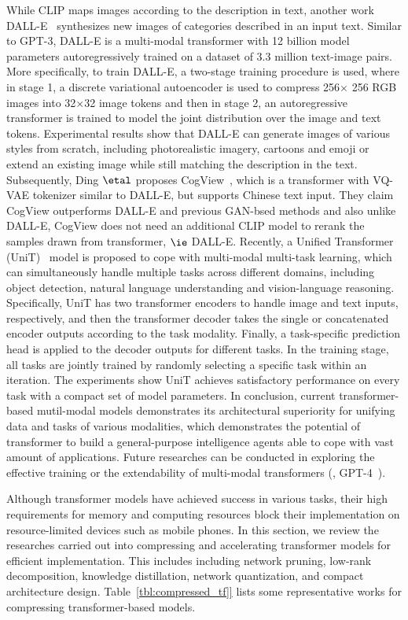While CLIP maps images according to the description in text, another work DALL-E~ synthesizes new images of categories described in an input text. Similar to GPT-3, DALL-E is a multi-modal transformer with 12 billion model parameters autoregressively trained on a dataset of 3.3 million text-image pairs. More specifically, to train DALL-E, a two-stage training procedure is used, where in stage 1, a discrete variational autoencoder is used to compress 256$\times$ 256 RGB images into 32$\times$32 image tokens and then in stage 2, an autoregressive transformer is trained to model the joint distribution over the image and text tokens. Experimental results show that DALL-E can generate images of various styles from scratch, including photorealistic imagery, cartoons and emoji or extend an existing image while still matching the description in the text. Subsequently, Ding $\etal$ proposes CogView~, which is a transformer with VQ-VAE tokenizer similar to DALL-E, but supports Chinese text input. They claim CogView outperforms DALL-E and previous GAN-bsed methods and also unlike DALL-E, CogView does not need an additional CLIP model to rerank the samples drawn from transformer, $\ie$ DALL-E.
Recently, a Unified Transformer (UniT)~ model is proposed to cope with multi-modal multi-task learning, which can simultaneously handle multiple tasks across different domains, including object detection, natural language understanding and vision-language reasoning. Specifically, UniT has two transformer encoders to handle image and text inputs, respectively, and then the transformer decoder takes the single or concatenated encoder outputs according to the task modality. Finally, a task-specific prediction head is applied to the decoder outputs for different tasks. In the training stage, all tasks are jointly trained by randomly selecting a specific task within an iteration. The experiments show UniT achieves satisfactory performance on every task with a compact set of model parameters.
In conclusion, current transformer-based mutil-modal models demonstrates its architectural superiority for unifying data and tasks of various modalities, which demonstrates the potential of transformer to build a general-purpose intelligence agents able to cope with vast amount of applications. Future researches can be conducted in exploring the effective training or the extendability of multi-modal transformers (\eg, GPT-4~).

\label{Sec:efficient}
Although transformer models have achieved success in various tasks, their high requirements for memory and computing resources block their implementation on resource-limited devices such as mobile phones. In this section, we review the researches carried out into compressing and accelerating transformer models for efficient implementation. This includes including network pruning, low-rank decomposition, knowledge distillation, network quantization, and compact architecture design. Table~\ref{tbl:compressed_tf]} lists some representative works for compressing transformer-based models.

